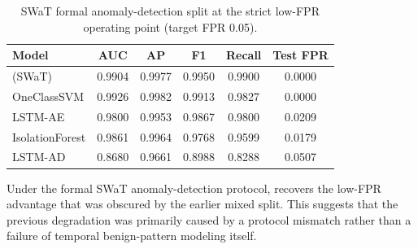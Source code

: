 \begin{table}[!t]
  \centering
  \caption{SWaT formal anomaly-detection split at the strict low-FPR operating point (target FPR 0.05).}
  \label{tab:swat-unsup-formal}
  \begin{tabular}{lccccc}
    \toprule
    Model & AUC & AP & F1 & Recall & Test FPR \\
    \midrule
    \model{} (SWaT) & 0.9904 & 0.9977 & 0.9950 & 0.9900 & 0.0000 \\
    OneClassSVM & 0.9926 & 0.9982 & 0.9913 & 0.9827 & 0.0000 \\
    LSTM-AE & 0.9800 & 0.9953 & 0.9867 & 0.9800 & 0.0209 \\
    IsolationForest & 0.9861 & 0.9964 & 0.9768 & 0.9599 & 0.0179 \\
    LSTM-AD & 0.8680 & 0.9661 & 0.8988 & 0.8288 & 0.0507 \\
    \bottomrule
  \end{tabular}
\end{table}

Under the formal SWaT anomaly-detection protocol, \model{} recovers the low-FPR advantage that was obscured by the earlier mixed split. This suggests that the previous degradation was primarily caused by a protocol mismatch rather than a failure of temporal benign-pattern modeling itself.
